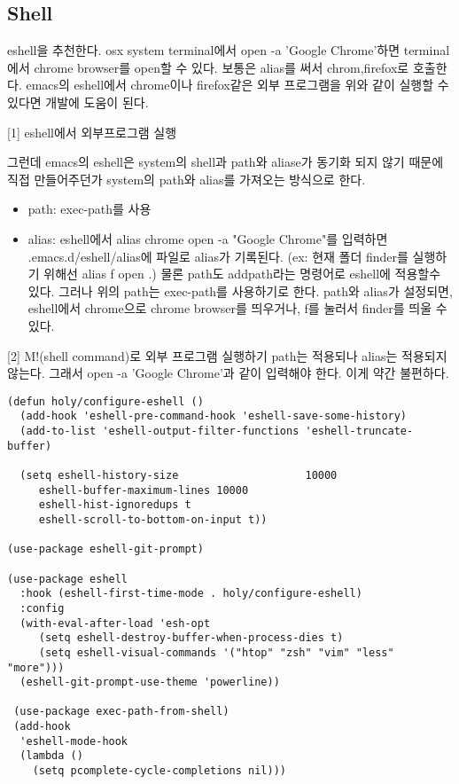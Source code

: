 \documentclass[11pt]{article}
\begin{document}
\subsection*{Shell}
\label{sec:org98fb03c}
eshell을 추천한다.
osx system terminal에서 open -a 'Google Chrome'하면  terminal에서 chrome browser를 open할 수 있다. 보통은 alias를 써서 chrom,firefox로 호출한다. emacs의 eshell에서 chrome이나 firefox같은 외부 프로그램을  위와 같이 실행할 수 있다면 개발에 도움이 된다. 

[1] eshell에서 외부프로그램 실행

그런데  emacs의 eshell은 system의 shell과 path와 aliase가 동기화 되지 않기 때문에 직접 만들어주던가 system의 path와 alias를 가져오는 방식으로 한다.
\begin{itemize}
\item path: exec-path를 사용
\item alias: eshell에서 alias chrome open -a "Google Chrome"를 입력하면 .emacs.d/eshell/alias에 파일로 alias가 기록된다. (ex: 현재 폴더 finder를 실행하기 위해선  alias f open .)
물론 path도 addpath라는 명령어로 eshell에 적용할수 있다. 그러나 위의 path는 exec-path를 사용하기로 한다.
path와 alias가 설정되면, eshell에서 chrome으로 chrome browser를  띄우거나, f를 눌러서 finder를 띄울 수 있다.
\end{itemize}

[2] M!(shell command)로 외부 프로그램 실행하기
path는 적용되나 alias는 적용되지 않는다. 그래서 open -a 'Google Chrome'과 같이 입력해야 한다. 이게 약간 불편하다. 
\begin{verbatim}
(defun holy/configure-eshell ()
  (add-hook 'eshell-pre-command-hook 'eshell-save-some-history)
  (add-to-list 'eshell-output-filter-functions 'eshell-truncate-buffer)

  (setq eshell-history-size                    10000
	 eshell-buffer-maximum-lines 10000
	 eshell-hist-ignoredups t
	 eshell-scroll-to-bottom-on-input t))

(use-package eshell-git-prompt)

(use-package eshell
  :hook (eshell-first-time-mode . holy/configure-eshell)
  :config
  (with-eval-after-load 'esh-opt
     (setq eshell-destroy-buffer-when-process-dies t)
     (setq eshell-visual-commands '("htop" "zsh" "vim" "less" "more")))
  (eshell-git-prompt-use-theme 'powerline))

 (use-package exec-path-from-shell)
 (add-hook
  'eshell-mode-hook
  (lambda ()
    (setq pcomplete-cycle-completions nil)))
\end{verbatim}
\end{document}
